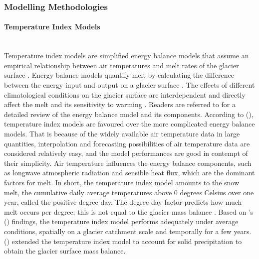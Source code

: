 \subsubsection{Modelling Methodologies}

\paragraph{Temperature Index Models}\mbox{} \\
Temperature index models are simplified energy balance models that assume an empirical relationship between air temperatures and melt rates of the glacier surface \cite{hock-2003}. Energy balance models quantify melt by calculating the difference between the energy input and output on a glacier surface \cite{maussion2019oggm}. The effects of different climatological conditions on the glacier surface are interdependent and directly affect the melt and its sensitivity to warming \cite{cuffey-2010}. Readers are referred to \cite{cuffey-2010, van-den-broeke-2020} for a detailed review of the energy balance model and its components.  According to \citeauthor{hock-2003} (\citeyear{hock-2003}), temperature index models are favoured over the more complicated energy balance models. That is because of the widely available air temperature data in large quantities, interpolation and forecasting possibilities of air temperature data are considered relatively easy, and the model performances are good in contempt of their simplicity. Air temperature influences the energy balance components, such as longwave atmospheric radiation and sensible heat flux, which are the dominant factors for melt. In short, the temperature index model amounts to the snow melt, the cumulative daily average temperatures above 0 degrees Celsius over one year, called the positive degree day. The degree day factor predicts how much melt occurs per degree; this is not equal to the glacier mass balance \cite{hock-2003, maussion2019oggm}. Based on \citeauthor{hock-2003}'s (\citeyear{hock-2003}) findings, the temperature index model performs adequately under average conditions, spatially on a glacier catchment scale and temporally for a few years. \citeauthor{marzeion-2012} (\citeyear{marzeion-2012}) extended the temperature index model to account for solid precipitation to obtain the glacier surface mass balance.  

\clearpage

